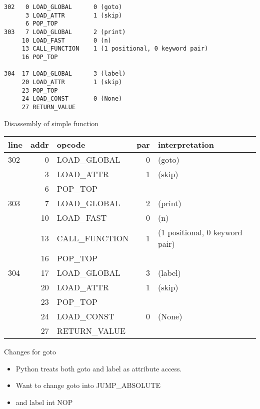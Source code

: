 \documentclass{beamer}
\begin{document}
\begin{frame}[fragile]
\begin{verbatim}
302   0 LOAD_GLOBAL      0 (goto) 
      3 LOAD_ATTR        1 (skip) 
      6 POP_TOP              
303   7 LOAD_GLOBAL      2 (print) 
     10 LOAD_FAST        0 (n) 
     13 CALL_FUNCTION    1 (1 positional, 0 keyword pair) 
     16 POP_TOP              

304  17 LOAD_GLOBAL      3 (label) 
     20 LOAD_ATTR        1 (skip) 
     23 POP_TOP              
     24 LOAD_CONST       0 (None) 
     27 RETURN_VALUE         
\end{verbatim}
\end{frame}

\begin{frame}[fragile]{Disassembly of simple function}
\begin{tabular}{l|r|l|r|l}
line & addr & opcode & par & interpretation \\
\hline
302 &          0 & LOAD\_GLOBAL         &     0 & (goto)  \\
     &           3 &  LOAD\_ATTR               &   1  & (skip)  \\
      &          6 &  POP\_TOP      &  &           \\
\hline
303   &          7 &  LOAD\_GLOBAL         &       2  & (print)  \\
          &     10 &  LOAD\_FAST           &       0 &  (n)  \\
              & 13 &  CALL\_FUNCTION        &      1  & (1 positional, 0 keyword pair)  \\
     &          16 &  POP\_TOP            &     &  \\
\hline
304   &         17 &  LOAD\_GLOBAL        &        3  & (label)  \\
     &          20 &  LOAD\_ATTR          &        1  & (skip)  \\
     &          23 &  POP\_TOP            &     &  \\
     &          24 &  LOAD\_CONST         &        0  & (None)  \\
     &          27 &  RETURN\_VALUE      &      &  \\
\end{tabular}
\end{frame}

\begin{frame}{Changes for goto}

\begin{itemize}
\item Python treats both goto and label as attribute access.

\item Want to change goto into JUMP\_ABSOLUTE

\item and label int NOP
\end{itemize}
\end{frame}
\end{document}

